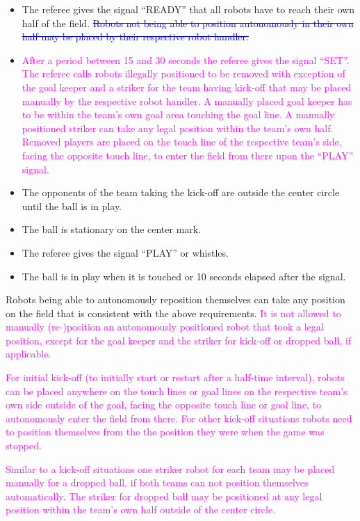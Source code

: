 \begin{itemize}
\item The referee gives the signal ``READY'' that all robots have to reach their own half of the field. \textcolor{blue}{\sout{Robots not being able to position autonomously in their own half may be placed by their respective robot handler.}}
\item \textcolor{magenta}{After a period between 15 and 30 seconds the referee gives the signal ``SET''. The referee calls robots illegally positioned to be removed with exception of the goal keeper and a striker for the team having kick-off that may be placed manually by the respective robot handler. A manually placed goal keeper has to be within the team's own goal area touching the goal line. A manually positioned striker can take any legal position within the team's own half. Removed players are placed on the touch line of the respective team's side, facing the opposite touch line, to enter the field from there upon the ``PLAY'' signal. } 
\item The opponents of the team taking the kick-off are outside the center circle until the ball is in play.
\item The ball is stationary on the center mark. 
\item The referee gives the signal ``PLAY'' or whistles.
\item The ball is in play when it is touched or 10 seconds elapsed after the signal.
\end{itemize}

Robots being able to autonomously reposition themselves can take any position on the field that is consistent with the above requirements. \textcolor{magenta}{It is not allowed to manually (re-)position an autonomously positioned robot that took a legal position, except for the goal keeper and the striker for kick-off or dropped ball, if applicable.}
 
\textcolor{magenta}{For initial kick-off (to initially start or restart after a half-time interval), robots can be placed anywhere on the touch lines or goal lines on the respective team's own side outside of the goal, facing the opposite touch line or goal line, to autonomously enter the field from there. For other kick-off situations robots need to position themselves from the the position they were when the game was stopped.}

\textcolor{magenta}{Similar to a kick-off situations one striker robot for each team may be placed manually for a dropped ball, if both teams can not position themselves automatically. The striker for dropped ball may be positioned at any legal position within the team's own half outside of the center circle.}

